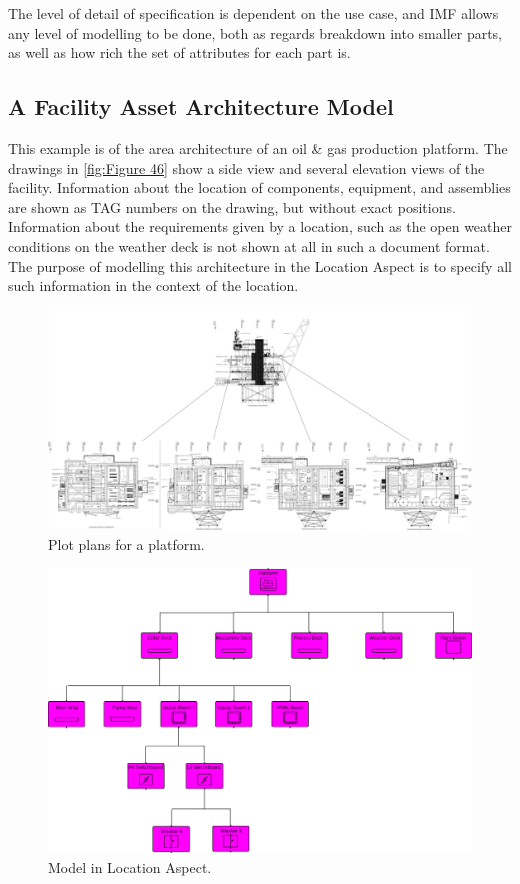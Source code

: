 \documentclass[../main.tex]{subfiles}
\begin{document}
The level of detail of specification is dependent on the use case, and IMF allows any level of modelling to be done,
both as regards breakdown into smaller parts, as well as how rich the set of attributes for each part is.

\subsection{A Facility Asset Architecture Model}
This example is of the area architecture of an oil \& gas production platform. The
drawings in \autoref{fig:Figure 46}  show a side view and several elevation views of the facility. Information about the location
of components, equipment, and assemblies are shown as TAG numbers on the drawing, but without exact positions.
Information about the requirements given by a location, such as the open weather conditions on the weather deck is
not shown at all in such a document format. The purpose of modelling this architecture in the Location Aspect is to
specify all such information in the context of the location.

\begin{figure}[htb]
  \centering
  \includegraphics[width=1\textwidth]{img/IMFmanual-img065.png}
  \caption{Plot plans for a platform.}
  \label{fig:Figure 46}
\end{figure}

\begin{figure}[htb]\centering
  \includegraphics[width=1\textwidth]{img/IMFmanual-img066.png}
  \caption{Model in Location Aspect.}
  \label{fig:Figure 47}
\end{figure}
\end{document}
